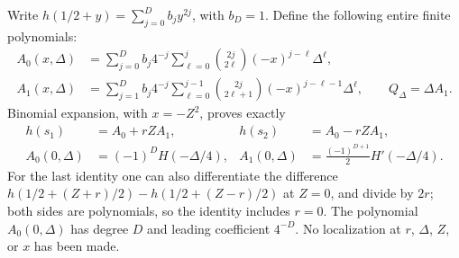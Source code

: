 Write \(h(1/2+y)=\sum_{j=0}^D b_jy^{2j}\), with \(b_D=1\).
Define the following entire finite polynomials:
\[
 \begin{aligned}
 A_0(x,\Delta)
 &=\sum_{j=0}^D b_j4^{-j}
       \sum_{\ell=0}^j\binom{2j}{2\ell}(-x)^{j-\ell}\Delta^\ell,\\
 A_1(x,\Delta)
 &=\sum_{j=1}^D b_j4^{-j}
       \sum_{\ell=0}^{j-1}\binom{2j}{2\ell+1}
                         (-x)^{j-\ell-1}\Delta^\ell,\qquad
 Q_\Delta=\Delta A_1.
 \end{aligned}                                                    \tag{SSP.3}
\]
Binomial expansion, with \(x=-Z^2\), proves exactly
\[
 \begin{aligned}
 h(s_1)&=A_0+rZA_1,& h(s_2)&=A_0-rZA_1,\\
 A_0(0,\Delta)&=(-1)^DH(-\Delta/4),&
 A_1(0,\Delta)&=\frac{(-1)^{D+1}}2H'(-\Delta/4).
 \end{aligned}                                                    \tag{SSP.4}
\]
For the last identity one can also differentiate the difference
\(h(1/2+(Z+r)/2)-h(1/2+(Z-r)/2)\) at \(Z=0\), and divide
by \(2r\); both sides are polynomials, so the identity includes
\(r=0\).  The polynomial \(A_0(0,\Delta)\) has degree \(D\)
and leading coefficient \(4^{-D}\).  No localization at \(r\),
\(\Delta\), \(Z\), or \(x\) has been made.

